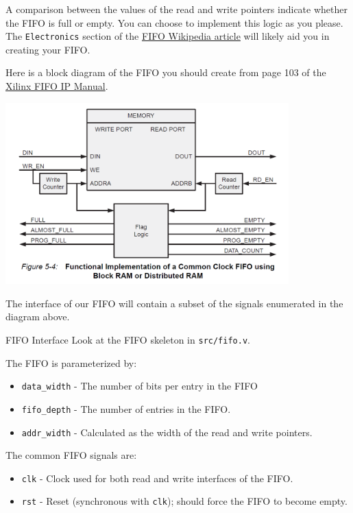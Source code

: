 \documentclass[11pt]{article}
\makeatletter
\renewcommand{\subsection}
{\@startsection {subsection}{1}{0pt}
 {-1ex}
 {0.5ex}
 {\bfseries\normalsize}}
\makeatother
\begin{document}
A comparison between the values of the read and write pointers indicate whether the FIFO is full or empty.
You can choose to implement this logic as you please.
The \verb|Electronics| section of the \href{https://en.wikipedia.org/wiki/FIFO_(computing_and_electronics)}{FIFO Wikipedia article} will likely aid you in creating your FIFO.

Here is a block diagram of the FIFO you should create from page 103 of the \href{https://www.xilinx.com/support/documentation/ip_documentation/fifo_generator_ug175.pdf}{Xilinx FIFO IP Manual}.

\begin{center}
    \includegraphics[height=7cm]{sync_fifo_diagram.png}
\end{center}

The interface of our FIFO will contain a subset of the signals enumerated in the diagram above.

\subsection{FIFO Interface}
Look at the FIFO skeleton in \verb|src/fifo.v|.

The FIFO is parameterized by:
\begin{itemize}
    \item \verb|data_width| - The number of bits per entry in the FIFO
    \item \verb|fifo_depth| - The number of entries in the FIFO.
    \item \verb|addr_width| - Calculated as the width of the read and write pointers.
\end{itemize}

The common FIFO signals are:
\begin{itemize}
    \item \verb|clk| - Clock used for both read and write interfaces of the FIFO.
    \item \verb|rst| - Reset (synchronous with \verb|clk|); should force the FIFO to become empty.
\end{itemize}
\end{document}
